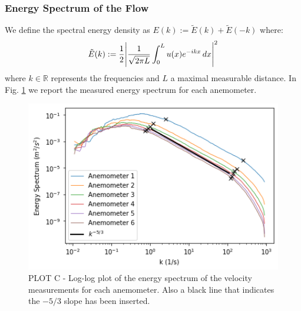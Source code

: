 \documentclass[11pt,titlepage]{article}
\begin{document}
\subsubsection{Energy Spectrum of the Flow} \label{energy_spectrum}
We define the spectral energy density as $E(k) :=\tilde{E}(k) + \tilde{E}(-k)$ where:
\begin{equation*}
	\tilde{E}(k):= \frac{1}{2} \abs{\frac{1}{\sqrt{2\pi L}} \int_0^L u(x) e^{-ikx}\, dx}^2
\end{equation*}
where $k\in \mathbb{R}$ represents the frequencies and $L$ a maximal measurable distance. 
In Fig. \ref{fig3} we report the measured energy spectrum for each anemometer.
	\begin{center} 
	\begin{figure} [h]
		\centering
		\includegraphics[width = 5in]{./figures/ex1_3.png}
		\caption{PLOT C - Log-log plot of the energy spectrum of the velocity measurements for each anemometer.  Also a black line that indicates the $-5/3$ slope has been inserted.}
		\label{fig3}
	\end{figure}
\end{center}
\end{document}
